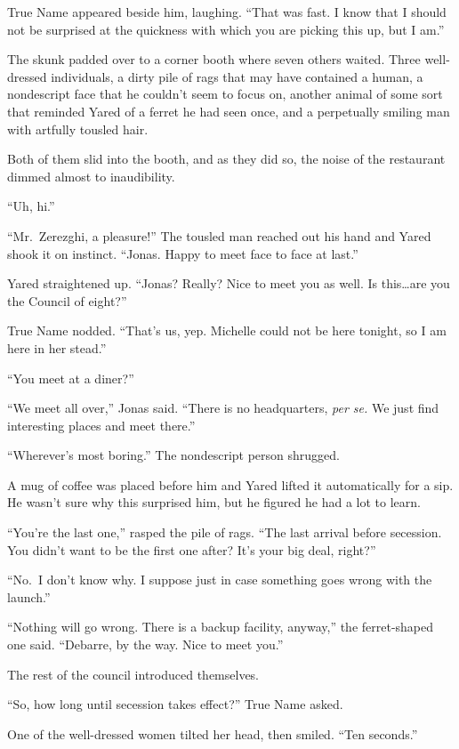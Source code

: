 True Name appeared beside him, laughing. ``That was fast. I know that I should not be surprised at the quickness with which you are picking this up, but I am.''

The skunk padded over to a corner booth where seven others waited. Three well-dressed individuals, a dirty pile of rags that may have contained a human, a nondescript face that he couldn't seem to focus on, another animal of some sort that reminded Yared of a ferret he had seen once, and a perpetually smiling man with artfully tousled hair.

Both of them slid into the booth, and as they did so, the noise of the restaurant dimmed almost to inaudibility.

``Uh, hi.''

``Mr.~Zerezghi, a pleasure!'' The tousled man reached out his hand and Yared shook it on instinct. ``Jonas. Happy to meet face to face at last.''

Yared straightened up. ``Jonas? Really? Nice to meet you as well. Is this\ldots are you the Council of eight?''

True Name nodded. ``That's us, yep. Michelle could not be here tonight, so I am here in her stead.''

``You meet at a diner?''

``We meet all over,'' Jonas said. ``There is no headquarters, \emph{per se.} We just find interesting places and meet there.''

``Wherever's most boring.'' The nondescript person shrugged.

A mug of coffee was placed before him and Yared lifted it automatically for a sip. He wasn't sure why this surprised him, but he figured he had a lot to learn.

``You're the last one,'' rasped the pile of rags. ``The last arrival before secession. You didn't want to be the first one after? It's your big deal, right?''

``No.~I don't know why. I suppose just in case something goes wrong with the launch.''

``Nothing will go wrong. There is a backup facility, anyway,'' the ferret-shaped one said. ``Debarre, by the way. Nice to meet you.''

The rest of the council introduced themselves.

``So, how long until secession takes effect?'' True Name asked.

One of the well-dressed women tilted her head, then smiled. ``Ten seconds.''

